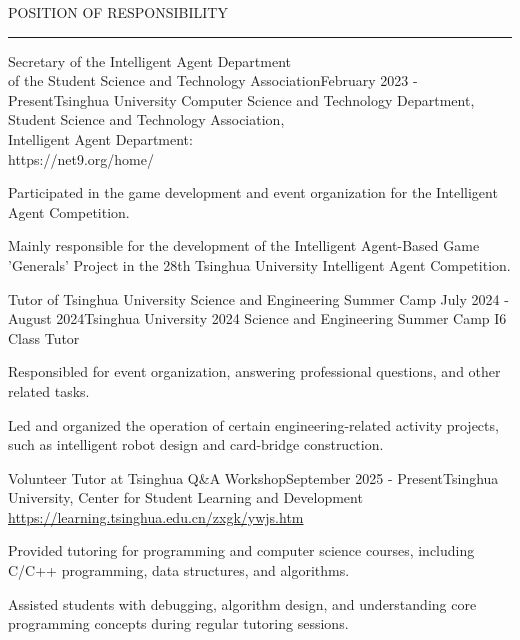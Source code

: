 \documentclass{resume} %
\renewenvironment{rSection}[1]{
\sectionskip
\textcolor{TsinghuaPurple}{\MakeUppercase{#1}}
\sectionlineskip
\hrule
\begin{list}{}{
\setlength{\leftmargin}{0em}
}
\item[]
}{
\end{list}
}
\begin{document}
\begin{rSection}{POSITION OF RESPONSIBILITY}

\begin{rSubsection}{Secretary of the Intelligent Agent Department \\of the Student Science and Technology Association}{February 2023 - Present}{Tsinghua University Computer Science and Technology Department,\\ Student Science and Technology Association,\\ Intelligent Agent Department:\\
https://net9.org/home/}{}              
\item Participated in the game development and event organization for the Intelligent Agent Competition.  
\item Mainly responsible for the development of the Intelligent Agent-Based Game 'Generals' Project in the 28th Tsinghua University Intelligent Agent Competition.
\end{rSubsection}  


\begin{rSubsection}{Tutor of Tsinghua University Science and Engineering Summer Camp} {July 2024 - August 2024}{Tsinghua University 2024 Science and Engineering Summer Camp I6 Class Tutor}{} 
\item Responsibled for event organization, answering professional questions, and other related tasks.
\item Led and organized the operation of certain engineering-related activity projects, such as intelligent robot design and card-bridge construction.
\end{rSubsection}


\begin{rSubsection}{Volunteer Tutor at Tsinghua Q\&A Workshop}{September 2025 - Present}{Tsinghua University, Center for Student Learning and Development\\\url{https://learning.tsinghua.edu.cn/zxgk/ywjs.htm}}{}
\item Provided tutoring for programming and computer science courses, including C/C++ programming, data structures, and algorithms.
\item Assisted students with debugging, algorithm design, and understanding core programming concepts during regular tutoring sessions.
\end{rSubsection}

\end{rSection}
\end{document}
